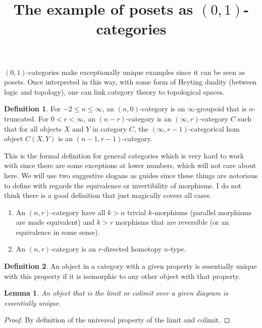 \documentclass[10pt]{article}
\theoremstyle{plain}%
\newtheorem{lemma}[theorem]{Lemma}
\theoremstyle{definition}
\newtheorem{definition}{Definition}[section]
\theoremstyle{remark}
\begin{document}
\title{The example of posets as $(0,1)$-categories}

\maketitle

$(0,1)$-categories make exceptionally unique examples since it can be seen as posets. Once interpreted in this way, with some form of Heyting duality (between logic and topology), one can link category theory to topological spaces.

\begin{definition}
	For $-2 \leq n \leq \infty$, an $(n,0)$-category is an $\infty$-groupoid that is $n$-truncated. For $0 < r < \infty$, an $(n-r)$-category is an $(\infty,r)$-category $C$ such that for all objects $X$ and $Y$ in category $C$, the $(\infty, r-1)$-categorical hom object $C(X,Y)$ is an $(n-1,r-1)$-category.
\end{definition}

This is the formal definition for general categories which is very hard to work with since there are some exceptions at lower numbers, which will not care about here. We will use two suggestive slogans as guides since these things are notorious to define with regards the equivalence or invertibility of morphisms. I do not think there is a good definition that just magically covers all cases.

\begin{enumerate}
	\item An $(n,r)$-category have all $k > n$ trivial $k$-morphisms (parallel morphisms are made equivalent) and $k > r$ morphisms that are reversible (or an equivalence in some sense).
	\item An $(n,r)$-category is an $r$-directed homotopy $n$-type.
\end{enumerate}

\begin{definition}
	An object in a category with a given property is essentially unique with this property if it is isomorphic to any other object with that property.
\end{definition}

\begin{lemma}
	An object that is the limit or colimit over a given diagram is essentially unique. 
\end{lemma}

\begin{proof}
	By definition of the universal property of the limit and colimit.
\end{proof}
\end{document}

